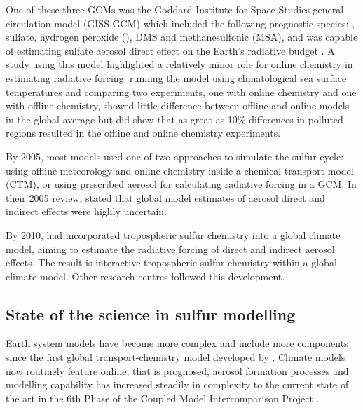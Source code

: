 One of these three GCMs was the Goddard Institute for Space Studies general circulation model (GISS GCM) which included the following prognostic species: , sulfate, hydrogen peroxide (), DMS and methanesulfonic (MSA), and was capable of estimating sulfate aerosol direct effect on the Earth’s radiative budget \citep{kochTroposphericSulfurSimulation1999}. A study using this model highlighted a relatively minor role for online chemistry in estimating radiative forcing: running the model using climatological sea surface temperatures and comparing two experiments, one with online chemistry and one with offline chemistry, showed little difference between offline and online models in the global average but did show that as great as 10\% differences in polluted regions resulted in the offline and online chemistry experiments.

By 2005, most models used one of two approaches to simulate the sulfur cycle: using offline meteorology and online chemistry inside a chemical transport model (CTM), or using prescribed aerosol for calculating radiative forcing in a GCM.  In their 2005 review, \citet{lohmannGlobalIndirectAerosol2005} stated that global model estimates of aerosol direct and indirect effects were highly uncertain. 

By 2010, \citet{tsaiSulfurCycleSulfate2010} had incorporated tropospheric sulfur chemistry into a global climate model, aiming to estimate the radiative forcing of direct and indirect aerosol effects. The result is interactive tropospheric sulfur chemistry within a global climate model. Other research centres followed this development.

\subsection{State of the science in sulfur modelling}

Earth system models have become more complex and include more components since the first global transport-chemistry model developed by \citet{langnerGlobalThreedimensionalModel1991}. Climate models now routinely feature online, that is prognosed, aerosol formation processes and modelling capability has increased steadily in complexity to the current state of the art in the 6th Phase of the Coupled Model Intercomparison Project \citep[CMIP6, details in next section;][]{eyringOverviewCoupledModel2016}. 

